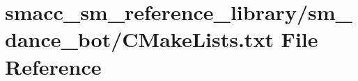 \hypertarget{sm__reference__library_2sm__dance__bot_2CMakeLists_8txt}{}\section{smacc\+\_\+sm\+\_\+reference\+\_\+library/sm\+\_\+dance\+\_\+bot/\+C\+Make\+Lists.txt File Reference}
\label{sm__reference__library_2sm__dance__bot_2CMakeLists_8txt}
